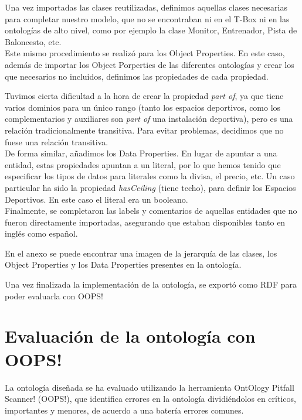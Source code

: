 \documentclass[a4paper,12pt]{article}
\begin{document}
	Una vez importadas las clases reutilizadas, definimos aquellas clases necesarias para completar nuestro modelo, que no se encontraban ni en el T-Box ni en las ontologías de alto nivel, como por ejemplo la clase Monitor, Entrenador, Pista de Baloncesto, etc.\\
		
	Este mismo procedimiento se realizó para los Object Properties. En este caso, además de importar los Object Porperties de las diferentes ontologías y crear los que necesarios no incluidos, definimos las propiedades de cada propiedad.
		
	Tuvimos cierta dificultad a la hora de crear la propiedad \textit{part of}, ya que tiene varios dominios para un único rango (tanto los espacios deportivos, como los complementarios y auxiliares son \textit{part of} una instalación deportiva), pero es una relación tradicionalmente transitiva. Para evitar problemas, decidimos que no fuese una relación transitiva.\\
		
	De forma similar, añadimos los Data Properties. En lugar de apuntar a una entidad, estas propiedades apuntan a un literal, por lo que hemos tenido que especificar los tipos de datos para literales como la divisa, el precio, etc. Un caso particular ha sido la propiedad \textit{hasCeiling} (tiene techo), para definir los Espacios Deportivos. En este caso el literal era un booleano.\\
	
	Finalmente, se completaron las labels y comentarios de aquellas entidades que no fueron directamente importadas, asegurando que estaban disponibles tanto en inglés como español. 
	
	En el anexo se puede encontrar una imagen de la jerarquía de las clases, los Object Properties y los Data Properties presentes en la ontología.
	
	Una vez finalizada la implementación de la ontología, se exportó como RDF para poder evaluarla con OOPS!
	
	\section{Evaluación de la ontología con OOPS!}
	La ontología diseñada se ha evaluado utilizando la herramienta OntOlogy Pitfall Scanner! (OOPS!)\cite{oops}, que identifica errores en la ontología dividiéndolos en críticos, importantes y menores, de acuerdo a una batería errores comunes.
	
\end{document}
